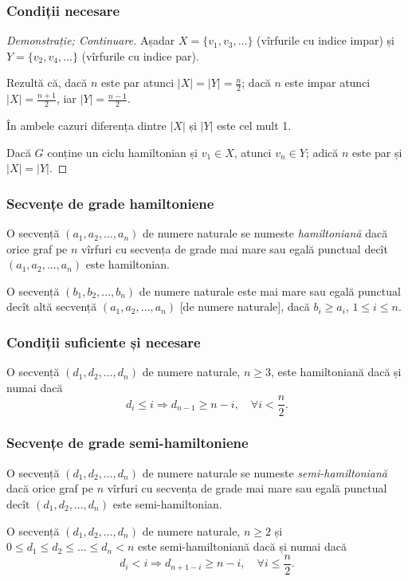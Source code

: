 \begin{frame}
  \frametitle{Condiții necesare}

\begin{proof}[Demonstrație; Continuare]
Așadar $X=\{v_1,v_3,...\}$ (vîrfurile cu indice impar) și $Y=\{v_2,v_4,...\}$ (vîrfurile cu indice par).
\pause

Rezultă că, dacă $n$ este par atunci $|X|=|Y|=\frac{n}{2}$; dacă $n$ este impar atunci $|X|=\frac{n+1}{2}$, iar $|Y|=\frac{n-1}{2}$.
\pause

În ambele cazuri diferența dintre $|X|$ și $|Y|$ este cel mult 1.
\pause

Dacă $G$ conține un ciclu hamiltonian și $v_1\in X$, atunci $v_n\in Y$; adică $n$ este par și $|X|=|Y|$.
\end{proof}
\end{frame}

\begin{frame}
  \frametitle{Secvențe de grade hamiltoniene}

\begin{definition}
O secvență $(a_1,a_2,...,a_n)$ de numere naturale se numeste \emph{hamiltoniană} dacă orice graf pe $n$ vîrfuri cu secvența de grade mai mare sau egală punctual decît $(a_1,a_2,...,a_n)$ este hamiltonian.
\end{definition}
\pause

O secvență $(b_1,b_2,...,b_n)$ de numere naturale este mai mare sau egală punctual decît altă secvență $(a_1,a_2,...,a_n)$ [de numere naturale], dacă $b_i\geq a_i$, $1\leq i\leq n$.


\end{frame}

\begin{frame}
  \frametitle{Condiții suficiente și necesare}

\begin{theorem}[Chvátal]
O secvență $(d_1,d_2,...,d_n)$ de numere naturale, $n\geq 3$, este hamiltoniană dacă și numai dacă 
\[
  d_i\leq i \Rightarrow d_{n-1}\geq n-i,\quad \forall i< \frac{n}{2}.
\]

\end{theorem}

\end{frame}


\begin{frame}
  \frametitle{Secvențe de grade semi-hamiltoniene}

\begin{definition}
O secvență $(d_1,d_2,...,d_n)$ de numere naturale se numeste \emph{semi-hamiltoniană} dacă orice graf pe $n$ vîrfuri cu secvența de grade mai mare sau egală punctual decît $(d_1,d_2,...,d_n)$ este semi-hamiltonian.
\end{definition}
\pause

\begin{corollary}
O secvență $(d_1,d_2,...,d_n)$ de numere naturale, $n\geq 2$ și $0\leq d_1\leq d_2\leq ...\leq d_n < n$ este semi-hamiltoniană dacă și numai dacă 
\[
  d_i< i \Rightarrow d_{n+1-i}\geq n-i,\quad \forall i\leq \frac{n}{2}.
\] 
\end{corollary}


\end{frame}

